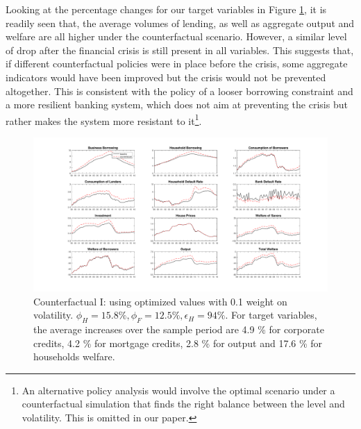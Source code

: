 \documentclass[12pt]{article}
\numberwithin{equation}{section}
\begin{document}
Looking at the percentage changes for our target variables in Figure \ref{counterfactual1}, it is readily seen that, the average volumes of lending, as well as aggregate output and welfare are all higher under the counterfactual scenario. However, a similar level of drop after the financial crisis is still present in all variables. This suggests that, if different counterfactual policies were in place before the crisis, some aggregate indicators would have been improved but the crisis would not be prevented altogether. This is consistent with the policy of a looser borrowing constraint and a more resilient banking system, which does not aim at preventing the crisis but rather makes the system more resistant to it\footnote{An alternative policy analysis would involve the optimal scenario under a counterfactual simulation that finds the right balance between the level and volatility. This is omitted in our paper.}. 



\begin{figure}[H]{}
\centering
\caption{Counterfactual I: using optimized values  with 0.1 weight on volatility. $\phi_H=15.8 \%, \phi_F=12.5 \%, \epsilon_H=94 \%$. For target variables, the average increases over the sample period are 4.9 \% for corporate credits, 4.2 \% for mortgage credits, 2.8 \% for output and 17.6 \% for households welfare.   }
\label{counterfactual1}
\includegraphics[scale=0.4]{main_counterfactual.pdf}
\end{figure}


\end{document}
